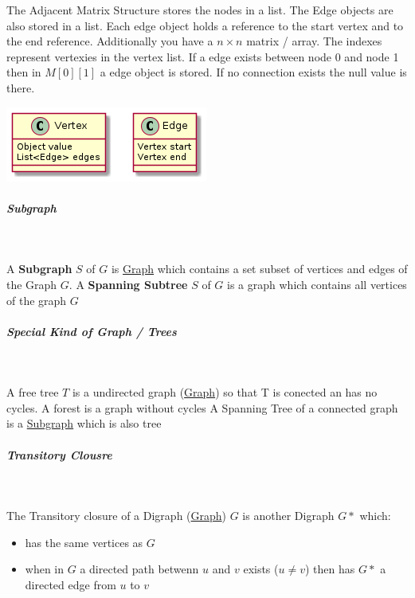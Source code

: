 \documentclass[11pt,twoside,twocolumn,landscape]{article}
\begin{document}
The Adjacent Matrix Structure stores the nodes in a list.
The Edge objects are also stored in a list.
Each edge object holds a reference to the start vertex and to the end reference.
Additionally you have a \(n \times n\) matrix / array.
The indexes represent vertexies in the vertex list.
If a edge exists between node 0 and node 1 then in \(M[0][1]\) a edge object is stored.
If no connection exists the null value is there. 



\begin{center}
\includegraphics[width=.9\linewidth]{img/adjacent_matrix_structure.png}
\end{center}

\subparagraph{Subgraph} \
\label{sec:orgf1b28d9}

A \textbf{Subgraph} \(S\) of \(G\) is \href{../../../roam/20220201163000-graph.org}{Graph} which contains a set subset of vertices and edges of the Graph \(G\).
A \textbf{Spanning Subtree} \(S\) of \(G\) is a graph which contains all vertices of the graph \(G\)

\subparagraph{Special Kind of Graph / Trees} \
\label{sec:org8f0e60f}

A free tree \(T\) is a undirected graph (\href{../../../roam/20220201163000-graph.org}{Graph}) so that T is conected an has no cycles.
A forest is a graph without cycles
A Spanning Tree of a connected graph is a \href{../../../roam/20220201181419-subgraph.org}{Subgraph} which is also tree

\subparagraph{Transitory Clousre} \
\label{sec:org488636d}

The Transitory closure of a Digraph (\href{../../../roam/20220201163000-graph.org}{Graph}) \(G\) is another Digraph \(G*\) which:
\begin{itemize}
\item has the same vertices as \(G\)
\item when in \(G\) a directed path betwenn \(u\) and \(v\) exists (\(u \ne v\)) then has \(G*\) a directed edge from \(u\) to \(v\)
\end{itemize}
\end{document}
